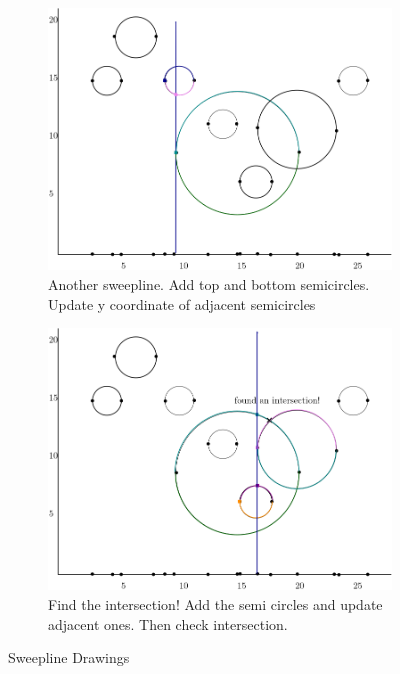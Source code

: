 \documentclass[11pt]{article}
\begin{document}
\begin{figure}[h!]
    \hfill
    \begin{subfigure}[b]{0.45\textwidth}
        \centering
        \includegraphics[width=\textwidth]{e2}
        \caption{Another sweepline. Add top and bottom semicircles. Update y coordinate of adjacent semicircles}
        \label{fig:five over x}
    \end{subfigure}
    \hfill
    \begin{subfigure}[b]{0.45\textwidth}
        \centering
        \includegraphics[width=\textwidth]{e3}
        \caption{Find the intersection! Add the semi circles and update adjacent ones. Then check intersection.}
        \label{fig:five over x}
    \end{subfigure}
       \caption{Sweepline Drawings}
       \label{fig:three graphs}
\end{figure}
\end{document}
